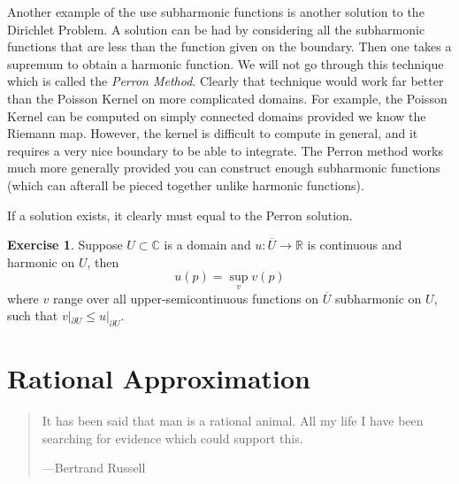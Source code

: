 \documentclass[12pt,openany]{book}
\newcommand{\C}{{\mathbb{C}}}
\newcommand{\R}{{\mathbb{R}}}
\newcommand{\myindex}[1]{#1\index{#1}}
\theoremstyle{plain}
\theoremstyle{remark}
\theoremstyle{definition}
\newenvironment{exbox}{%
    \def\FrameCommand{\vrule width 1pt \relax\hspace {10pt}}%
    \MakeFramed {\advance \hsize -\width \FrameRestore }%
}{%
    \endMakeFramed
}
\newenvironment{myquote}{%
    \begin{quote}%
    \begingroup\itshape
}{%
    \endgroup%
    \end{quote}
}
\theoremstyle{exercise}
\newtheorem{exercise}{Exercise}[section]
\theoremstyle{example}
\begin{document}
Another example of the use subharmonic functions is another solution
to the Dirichlet Problem.  A solution can be had by considering all the
subharmonic functions that are less than the function given on the boundary.
Then one takes a supremum to obtain a harmonic function.  We will not go
through this technique which is called the \emph{\myindex{Perron Method}}.
Clearly that technique would work far better than the Poisson Kernel on
more complicated domains.  For example, the Poisson Kernel can be computed
on simply connected domains provided we know the Riemann map.  However,
the kernel is difficult to compute in general, and it requires a very nice
boundary to be able to integrate.  The Perron method works much more
generally provided you can construct enough subharmonic functions (which can
afterall be pieced together unlike harmonic functions).

If a solution exists, it clearly must equal to the Perron solution.

\begin{exbox}
\begin{exercise}
Suppose $U \subset \C$ is a domain and
$u \colon \overline{U} \to \R$ is continuous and
harmonic on $U$, then
\begin{equation*}
u(p) = \sup_{v} v(p)
\end{equation*}
where $v$ range over all upper-semicontinuous functions on $\overline{U}$
subharmonic on $U$,
such that $v|_{\partial U} \leq u|_{\partial U}$.
\end{exercise}
\end{exbox}


\chapter{Rational Approximation} \label{ch:runge}

\begin{myquote}
It has been said that man is a rational animal. All my life I have been searching for evidence which could support this.

---Bertrand Russell
\end{myquote}

\end{document}
